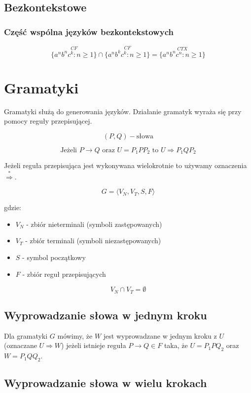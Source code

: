 \documentclass{../notatki}
\begin{document}
\subsection{Bezkontekstowe}

\subsubsection{Część wspólna języków bezkontekstowych}

$$
\stackrel{CF}{\{a^nb^nc^k : n \ge 1 \}} \cap \stackrel{CF}{\{a^nb^kc^k : n \ge 1
\}} = \stackrel{CTX}{\{a^nb^nc^n : n \ge 1\}}
$$

\section{Gramatyki}

Gramatyki służą do generowania języków.
Działanie gramatyk wyraża się przy pomocy reguły przepisującej.

$$
(P, Q) - \text{słowa}
$$

$$
\text{Jeżeli } P \rightarrow Q \text{ oraz } U = P_1PP_2 \text{ to }
U \Rightarrow P_1QP_2
$$

Jeżeli reguła przepisująca jest wykonywana wielokrotnie to używamy
oznaczenia $\stackrel{*}{\Rightarrow}$.

$$
G = \langle V_N, V_T, S, F \rangle
$$

gdzie:

\begin{itemize}
  \item $V_N$ - zbiór nieterminali (symboli zastępowanych)
  \item $V_T$ - zbiór terminali (symboli niezastępowanych)
  \item $S$ - symbol początkowy
  \item $F$ - zbiór reguł przepisujących
\end{itemize}

$$
V_N \cap V_T = \emptyset
$$

\subsection{Wyprowadzanie słowa w jednym kroku}

Dla gramatyki $G$ mówimy, że $W$ jest wyprowadzane w jednym kroku z
$U$ (oznaczane $U \Rightarrow W$) jeżeli istnieje reguła $P
\rightarrow Q \in F$ taka, że $U = P_1PQ_2$ oraz $W = P_1QQ_2$.

\subsection{Wyprowadzanie słowa w wielu krokach}
\end{document}
